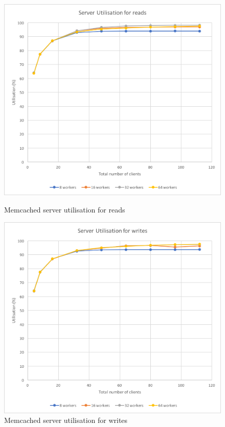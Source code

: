 \documentclass[11pt,a4paper]{article}
\begin{document}
\begin{figure}[!h]
    \centering
    \begin{minipage}[b]{.45\textwidth}
        \centering
        \includegraphics[width=\textwidth]{processing/graphics/q_network_svr_util_2mw_reads.png}
        \caption{Memcached server utilisation for reads}
        \label{png::q_network_svr_util_2mw_reads}
    \end{minipage}
    \qquad
    \begin{minipage}[b]{.45\textwidth}
        \centering
        \includegraphics[width=\textwidth]{processing/graphics/q_network_svr_util_2mw_writes.png}
        \caption{Memcached server utilisation for writes}
        \label{png::q_network_svr_util_2mw_writes}
    \end{minipage}
\end{figure}
\end{document}
